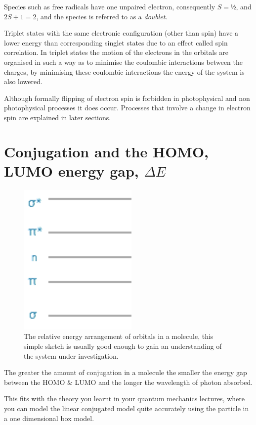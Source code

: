 \documentclass[
]{book}
\begin{document}
Species such as free radicals have one unpaired electron, consequently \(S = ½\), and \(2S + 1 = 2\), and the species is referred to as a \emph{doublet}.

Triplet states with the same electronic configuration (other than spin) have a lower energy than corresponding singlet states due to an effect called spin correlation. In triplet states the motion of the electrons in the orbitals are organised in such a way as to minimise the coulombic interactions between the charges, by minimising these coulombic interactions the energy of the system is also lowered.

Although formally flipping of electron spin is forbidden in photophysical and non photophysical processes it does occur. Processes that involve a change in electron spin are explained in later sections.

\hypertarget{sec:conjugationandenergygap}{%
\section{\texorpdfstring{Conjugation and the HOMO, LUMO energy gap, \(\Delta E\)}{Conjugation and the HOMO, LUMO energy gap, \textbackslash Delta E}}\label{sec:conjugationandenergygap}}

\begin{figure}

{\centering \includegraphics[width=0.2\linewidth]{images/nPiSigmaenergylevels} 

}

\caption{The relative energy arrangement of orbitals in a molecule, this simple sketch is usually good enough to gain an understanding of the system under investigation.}\label{fig:EnergyLevels}
\end{figure}

The greater the amount of conjugation in a molecule the smaller the energy gap between the HOMO \& LUMO and the longer the wavelength of photon absorbed.

This fits with the theory you learnt in your quantum mechanics lectures, where you can model the linear conjugated model quite accurately using the particle in a one dimensional box model.
\end{document}
